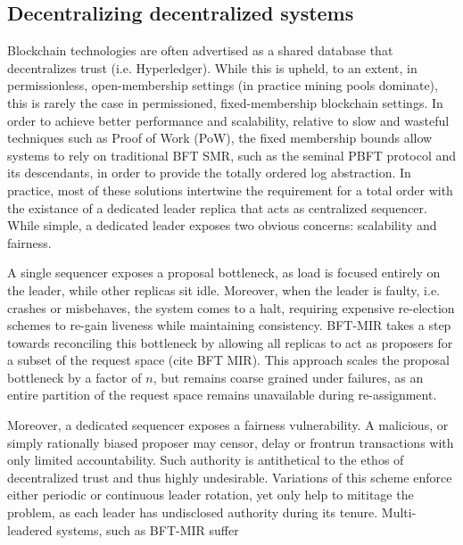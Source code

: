 \subsection{Decentralizing decentralized systems}
Blockchain technologies are often advertised as a shared database that decentralizes trust (i.e. Hyperledger). While this is upheld, to an extent, in permissionless, open-membership settings (in practice mining pools dominate), this is rarely the case in permissioned, fixed-membership blockchain settings. In order to achieve better performance and scalability, relative to slow and wasteful techniques such as Proof of Work (PoW), the fixed membership bounds allow systems to rely on traditional BFT SMR, such as the seminal PBFT protocol and its descendants, in order to provide the totally ordered log abstraction.
In practice, most of these solutions intertwine the requirement for a total order with the existance of a dedicated leader replica that acts as centralized sequencer. While simple,  a dedicated leader exposes two obvious concerns: scalability and fairness.

A single sequencer exposes a proposal bottleneck, as load is focused entirely on the leader, while other replicas sit idle. Moreover, when the leader is faulty, i.e. crashes or misbehaves, the system comes to a halt, requiring expensive re-election schemes to re-gain liveness while maintaining consistency. BFT-MIR takes a step towards reconciling this bottleneck by allowing all replicas to act as proposers for a subset of the request space (cite BFT MIR). This approach scales the proposal bottleneck by a factor of $n$, but remains coarse grained under failures, as an entire partition of the request space remains unavailable during re-assignment.

Moreover, a dedicated sequencer exposes a fairness vulnerability. A malicious, or simply rationally biased proposer may censor, delay or frontrun transactions with only limited accountability. Such authority is antithetical to the ethos of decentralized trust and thus highly undesirable. Variations of this scheme enforce either periodic or continuous leader rotation, yet only help to mititage the problem, as each leader has undisclosed authority during its tenure. Multi-leadered systems, such as BFT-MIR  suffer

